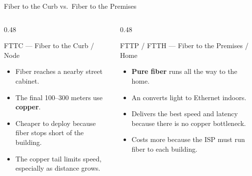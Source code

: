 \documentclass[aspectratio=169]{beamer}  %
\begin{document}
\begin{frame}[t,shrink=5]{Fiber to the Curb vs.\ Fiber to the Premises}
    \begin{columns}[T]
        \begin{column}{0.48\textwidth}
            \begin{block}{FTTC --- Fiber to the Curb / Node}
                \begin{itemize}
                    \footnotesize
                    \item Fiber reaches a nearby street cabinet.
                    \item The final 100--300 meters use \textbf{copper}.
                    \item Cheaper to deploy because fiber stops short of the building.
                    \item The copper tail limits speed, especially as distance grows.
                \end{itemize}
            \end{block}
        \end{column}
        \begin{column}{0.48\textwidth}
            \begin{block}{FTTP / FTTH --- Fiber to the Premises / Home}
                \begin{itemize}
                    \footnotesize
                    \item \textbf{Pure fiber} runs all the way to the home.
                    \item An  converts light to Ethernet indoors.
                    \item Delivers the best speed and latency because there is no copper bottleneck.
                    \item Costs more because the ISP must run fiber to each building.
                \end{itemize}
            \end{block}
        \end{column}
    \end{columns}
    \vspace{0.3em}
    \begin{center}
\end{center}
\end{frame}
\end{document}
